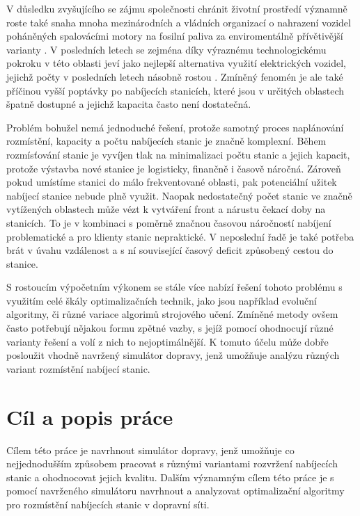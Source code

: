 \label{chap:uvod}

V důsledku zvyšujícího se zájmu společnosti chránit životní 
prostředí významně roste také snaha mnoha mezinárodních a vládních organizací
o nahrazení vozidel poháněných spalovácími motory na fosilní paliva za 
enviromentálně přívětivější varianty \citep{government_2022}.
V posledních letech se zejména díky výraznému technologickému 
pokroku v této oblasti jeví jako nejlepší alternativa
využití elektrických vozidel, jejichž počty v posledních letech násobně rostou 
\citep{iea_2022}. Zmíněný fenomén je ale také příčinou vyšší poptávky po nabíjecích stanicích, 
které jsou v určitých oblastech špatně dostupné a jejichž kapacita často není 
dostatečná.

Problém bohužel nemá jednoduché řešení, protože samotný proces 
naplánování rozmístění, kapacity a počtu nabíjecích stanic je značně komplexní.
Během rozmísťování stanic je vyvíjen tlak na minimalizaci počtu stanic a 
jejich kapacit, protože výstavba nové stanice je logisticky, finančně i časově
náročná. Zároveň pokud umístíme stanici do málo frekventované oblasti, pak 
potenciální užitek nabíjecí stanice nebude plně využit. Naopak nedostatečný počet 
stanic ve značně vytížených oblastech může vézt k vytváření front a nárustu čekací
doby na stanicích. To je v kombinaci s poměrně značnou časovou náročností nabíjení 
problematické a pro klienty stanic nepraktické. V neposlední řadě je také 
potřeba brát v úvahu vzdálenost a s ní související časový deficit způsobený 
cestou do stanice.

S rostoucím výpočetním výkonem se stále více nabízí řešení tohoto problému s
využitím celé škály optimalizačních technik, jako jsou například evoluční
algoritmy, či různé variace algorimů strojového učení. Zmíněné metody ovšem
často potřebují nějakou formu zpětné vazby, s jejíž pomocí ohodnocují různé
varianty řešení a volí z nich to nejoptimálnější. K tomuto účelu může dobře
posloužit vhodně navržený simulátor dopravy, jenž umožňuje analýzu různých
variant rozmístění nabíjecí stanic.


\section*{Cíl a popis práce}

Cílem této práce je navrhnout simulátor dopravy, jenž umožňuje co nejjednodušším
způsobem pracovat s různými variantami rozvržení nabíjecích stanic a ohodnocovat
jejich kvalitu. Dalším významným cílem této práce je s pomocí navrženého 
simulátoru navrhnout a analyzovat optimalizační algoritmy pro rozmístění 
nabíjecích stanic v dopravní síti.


